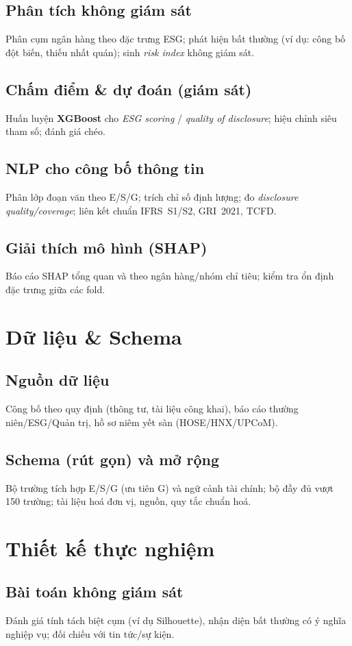 \documentclass[conference]{IEEEtran}
\begin{document}
\subsection{Phân tích không giám sát}
Phân cụm ngân hàng theo đặc trưng ESG; phát hiện bất thường (ví dụ: công bố đột biến, thiếu nhất quán); sinh \textit{risk index} không giám sát.

\subsection{Chấm điểm \& dự đoán (giám sát)}
Huấn luyện \textbf{XGBoost} cho \textit{ESG scoring} / \textit{quality of disclosure}; hiệu chỉnh siêu tham số; đánh giá chéo.

\subsection{NLP cho công bố thông tin}
Phân lớp đoạn văn theo E/S/G; trích chỉ số định lượng; đo \textit{disclosure quality/coverage}; liên kết chuẩn IFRS~S1/S2, GRI~2021, TCFD.

\subsection{Giải thích mô hình (SHAP)}
Báo cáo SHAP tổng quan và theo ngân hàng/nhóm chỉ tiêu; kiểm tra ổn định đặc trưng giữa các fold.

\section{Dữ liệu \& Schema}
\subsection{Nguồn dữ liệu}
Công bố theo quy định (thông tư, tài liệu công khai), báo cáo thường niên/ESG/Quản trị, hồ sơ niêm yết sàn (HOSE/HNX/UPCoM).

\subsection{Schema (rút gọn) và mở rộng}
Bộ trường tích hợp E/S/G (ưu tiên G) và ngữ cảnh tài chính; bộ đầy đủ vượt 150 trường; tài liệu hoá đơn vị, nguồn, quy tắc chuẩn hoá.

\section{Thiết kế thực nghiệm}
\subsection{Bài toán không giám sát}
Đánh giá tính tách biệt cụm (ví dụ Silhouette), nhận diện bất thường có ý nghĩa nghiệp vụ; đối chiếu với tin tức/sự kiện.
\end{document}
